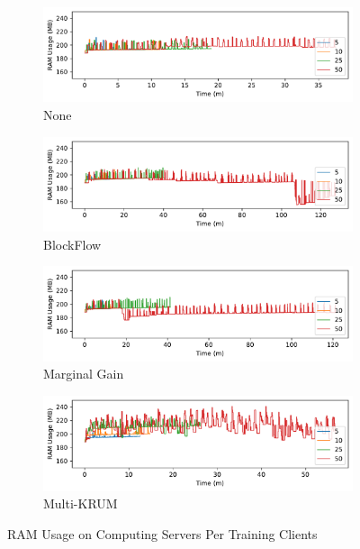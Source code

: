 \begin{figure}[!h]
    \centering
    \begin{subfigure}[b]{0.49\textwidth}
        \centering
        \includegraphics[width=\textwidth]{graphics/clients/ram_none_server.pdf}
        \caption{None}
    \end{subfigure}
    \hfill
    \begin{subfigure}[b]{0.49\textwidth}
        \centering
        \includegraphics[width=\textwidth]{graphics/clients/ram_blockflow_server.pdf}
        \caption{BlockFlow}
    \end{subfigure}
    \hfill
    \begin{subfigure}[b]{0.49\textwidth}
        \centering
        \includegraphics[width=\textwidth]{graphics/clients/ram_marginalgain_server.pdf}
        \caption{Marginal Gain}
    \end{subfigure}
    \hfill
    \begin{subfigure}[b]{0.49\textwidth}
        \centering
        \includegraphics[width=\textwidth]{graphics/clients/ram_multikrum_server.pdf}
        \caption{Multi-KRUM}
    \end{subfigure}
    \caption{RAM Usage on Computing Servers Per Training Clients}
    \label{fig:ram_clients_degree_server}
\end{figure}

